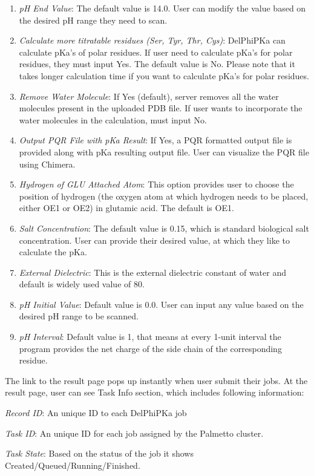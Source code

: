 \documentclass[9pt,tutorial]{livecoms}
\begin{document}
\begin{enumerate}
    \item \textit{ pH End Value}: The default value is 14.0. User can modify the value based on the desired pH range they need to scan.
    \item \textit{ Calculate more titratable residues (Ser, Tyr, Thr, Cys)}: DelPhiPKa can calculate pKa’s of polar residues. If user need to calculate pKa’s for polar residues, they must input Yes. The default value is No. Please note that it takes longer calculation time if you want to calculate pKa’s for polar residues.  
    \item \textit{ Remove Water Molecule}: If Yes (default), server removes all the water molecules present in the uploaded PDB file. If user wants to incorporate the water molecules in the calculation, must input No.
    \item \textit{ Output PQR File with pKa Result}: If Yes, a PQR formatted output file is provided along with pKa resulting output file. User can visualize the PQR file using Chimera.
    \item \textit{ Hydrogen of GLU Attached Atom}: This option provides user to choose the position of hydrogen (the oxygen atom at which hydrogen needs to be placed, either OE1 or OE2) in glutamic acid. The default is OE1.
    \item \textit{ Salt Concentration}: The default value is 0.15, which is standard biological salt concentration. User can provide their desired value, at which they like to calculate the pKa.
    \item \textit{ External Dielectric}: This is the external dielectric constant of water and default is widely used value of 80.
    \item \textit{ pH Initial Value}: Default value is 0.0. User can input any value based on the desired pH range to be scanned.
    \item \textit{ pH Interval}: Default value is 1, that means at every 1-unit interval the program provides the net charge of the side chain of the corresponding residue. 
\end{enumerate}
The link to the result page pops up instantly when user submit their jobs. At the result page, user can see Task Info section, which includes following information:

\textit{Record ID}: An unique ID to each DelPhiPKa job

\textit{Task ID}: An unique ID for each job assigned by the Palmetto cluster.

\textit{Task State}: Based on the status of the job it shows Created/Queued/Running/Finished.
\end{document}
